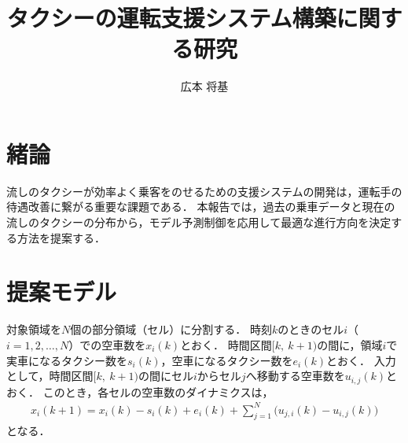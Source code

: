 \documentclass[a4j,10pt,twocolumn]{paper}
\title{タクシーの運転支援システム構築に関する研究}	%
\author{広本 将基}		%
\begin{document}
\absttitle		%

\section{緒論}
流しのタクシーが効率よく乗客をのせるための支援システムの開発は，運転手の待遇改善に繋がる重要な課題である．
本報告では，過去の乗車データと現在の流しのタクシーの分布から，モデル予測制御を応用して最適な進行方向を決定する方法を提案する．

\section{提案モデル}
対象領域を$N$個の部分領域（セル）に分割する．
時刻$k$のときのセル$i$（$i = 1, 2, \ldots, N$）での空車数を$x_i(k)$とおく．
時間区間$[k,\ k+1)$の間に，領域$i$で実車になるタクシー数を$s_i(k)$，空車になるタクシー数を$e_i(k)$とおく．
入力として，時間区間$[k,\ k+1)$の間にセル$i$からセル$j$へ移動する空車数を$u_{i, j}(k)$とおく．
このとき，各セルの空車数のダイナミクスは，
\begin{align}
 x_i(k+1) = x_i(k)-s_i(k)+e_i(k)+\sum_{j=1}^{N}\bigg(u_{j,i}(k)-u_{i,j}(k) \bigg) \label{eq:x}
\end{align}
となる．
\end{document}
